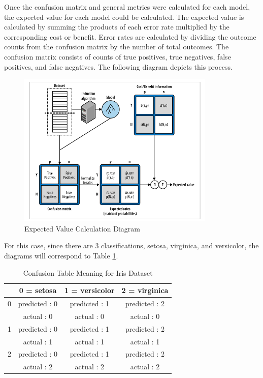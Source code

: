\documentclass[journal]{IEEEtran}
\begin{document}
Once the confusion matrix and general metrics were calculated for each model, the expected value for each model could be calculated. The expected value is calculated by summing the products of each error rate multiplied by the corresponding cost or benefit. Error rates are calculated by dividing the outcome counts from the confusion matrix by the number of total outcomes. The confusion matrix consists of counts of true positives, true negatives, false positives, and false negatives. The following diagram depicts this process. 

\begin{figure}[h!]
\includegraphics[scale=1]{expectedValDiagram.png}
\centering
\caption{Expected Value Calculation Diagram \cite{b5}}
\label{fig:expectedValDiagram}
\end{figure}

For this case, since there are 3 classifications, setosa, virginica, and versicolor, the diagrams will correspond to Table \ref{table:cm-meaning}.

\begin{table}[h!]
\centering
\begin{tabular}{ c || c | c | c }
& 0 = setosa &  1 = versicolor &  2 = virginica \\
\hline
\hline
0 & predicted : 0 & predicted : 1 & predicted : 2 \\
& actual : 0 & actual : 0 & actual : 0 \\
\hline
1 & predicted : 0 & predicted : 1 & predicted : 2 \\
& actual : 1 & actual : 1 & actual : 1 \\
\hline
2 & predicted : 0 & predicted : 1 & predicted : 2 \\
& actual : 2 & actual : 2 & actual : 2 \\
\end{tabular}
\caption{Confusion Table Meaning for Iris Dataset}
\label{table:cm-meaning}
\end{table}
\end{document}
